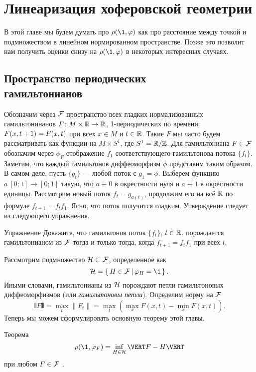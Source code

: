 \chapter{Линеаризация хоферовской геометрии}

В этой главе мы будем думать про $\rho (\1, \phi)$ как про расстояние между точкой и подмножеством в линейном нормированном пространстве.
Позже это позволит нам получить оценки снизу на $\rho (\1, \phi)$ в некоторых интересных случаях.

\section[Периодические гамильтонианы]{Пространство периодических\\гамильтонианов}

Обозначим через \index[symb]{$\F$}$\F$ пространство всех гладких нормализованных
гамильтонинанов $F\colon M \times \mathbb{R} \to \mathbb{R}$, 1-периодических по
времени: $F (x, t \z+ 1) = F (x, t)$ при всех $x \in M$ и $t\in\mathbb{R}$.
Такие $F$ мы часто будем рассматривать как функции на $M \times S^1$,
где $S^1 = \mathbb{R} / \mathbb{Z}$. 
Для гамильтониана $F \in \mathcal{F}$ обозначим через $\phi_F$ отображение
$f_1$ соответствующего гамильтонова потока $\{f_t\}$. 
Заметим, что каждый гамильтонов диффеоморфизм $\phi$ представим таким образом. 
В самом деле, пусть $\{g_t\}$ — любой поток с $g_1 = \phi$.
Выберем функцию $a\: [0; 1] \to [0; 1]$ такую, что $a \equiv 0$ в окрестности нуля и $a \equiv 1$ в окрестности единицы.
Рассмотрим новый поток $f_t = g_{a(t)}$, 
продолжим его на всё $\mathbb{R}$ по формуле $f_{t+1} = f_t f_1$.
Ясно, что поток получится гладким.
Утверждение следует из следующего упражнения.

\begin{ex}{Упражнение}\label{5.1.A}
Докажите, что гамильтонов поток $\{f_t\}$, $t \z\in \RR$,
порождается гамильтонианом из $\F$ тогда и только тогда, когда
$f_{t+1} = f_t f_1$ при всех $t$. 
\end{ex}

Рассмотрим подмножество \index[symb]{$\H$}$\mathcal{H} \subset \mathcal{F}$, определенное как 
\[\H = \set{H \in \F}{\phi_H = \1}.\]
Иными словами, гамильтонианы из $\H$ порождают петли гамильтоновых диффеоморфизмов (или \emph{гамильтоновы петли}).
Определим норму на $\F$ 
\[\VERT F \VERT = \max_{t} \| F_t \| = \max_{t} (\max_{x} F (x, t) -
\min_{x} F (x, t)).\]
Теперь мы можем сформулировать основную теорему этой главы.

\begin{thm}{Теорема}\label{5.1.B}
\[\rho (\1, \phi_F) = \inf_{H\in\H} \VERT F - H \VERT\]
при любом $F \in \mathcal{F}$ .
\end{thm}

